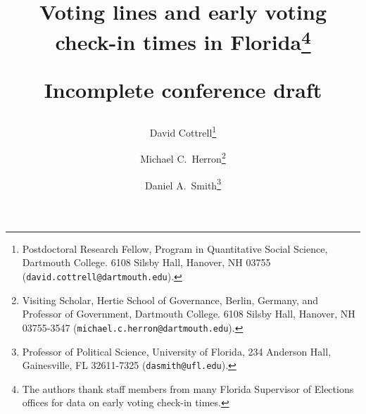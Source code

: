 \documentclass[12pt,titlepage]{article}
\begin{document}
\sloppy
\thispagestyle{empty}


\renewcommand{\topfraction}{.85}
\renewcommand{\bottomfraction}{.7}
\renewcommand{\textfraction}{.15}
\renewcommand{\floatpagefraction}{.66}
\renewcommand{\dbltopfraction}{.66}
\renewcommand{\dblfloatpagefraction}{.66}



\title{Voting lines and early voting check-in times in
  Florida\thanks{The authors thank staff members from many Florida
    Supervisor of Elections offices for data on early voting check-in
    times.}\author{David Cottrell\thanks{Postdoctoral Research Fellow,
      Program in Quantitative Social Science, Dartmouth College.  6108
      Silsby Hall, Hanover, NH 03755
      (\texttt{david.cottrell@dartmouth.edu}).} \and Michael C.\
    Herron\thanks{Visiting Scholar, Hertie School of Governance,
      Berlin, Germany, and Professor of Government, Dartmouth College.
      6108 Silsby Hall, Hanover, NH 03755-3547
      (\texttt{michael.c.herron@dartmouth.edu}).} \and Daniel A.\
    Smith\thanks{Professor of Political Science, University of
      Florida, 234 Anderson Hall, Gainesville, FL 32611-7325
      (\texttt{dasmith@ufl.edu}).}}\vspace{1cm}\newline\textbf{Incomplete
    conference draft}}


\maketitle \doublespacing 

\end{document}
